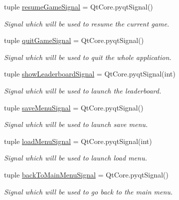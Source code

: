 \begin{DoxyCompactItemize}
\item 
tuple \hyperlink{classsrc_1_1pause__menu_1_1_pause_menu_a0b97feb3939cd6be81c71ba6dbe67669}{resume\+Game\+Signal} = Qt\+Core.\+pyqt\+Signal()
\begin{DoxyCompactList}\small\item\em Signal which will be used to resume the current game. \end{DoxyCompactList}\item 
tuple \hyperlink{classsrc_1_1pause__menu_1_1_pause_menu_aea554e6749ca45f516618711530a1acd}{quit\+Game\+Signal} = Qt\+Core.\+pyqt\+Signal()
\begin{DoxyCompactList}\small\item\em Signal which will be used to quit the whole application. \end{DoxyCompactList}\item 
tuple \hyperlink{classsrc_1_1pause__menu_1_1_pause_menu_abaa0c6d5831d9bfb1d99d7431e47a981}{show\+Leaderboard\+Signal} = Qt\+Core.\+pyqt\+Signal(int)
\begin{DoxyCompactList}\small\item\em Signal which will be used to launch the leaderboard. \end{DoxyCompactList}\item 
tuple \hyperlink{classsrc_1_1pause__menu_1_1_pause_menu_a48613202c1a9051758755bf8fcdd2ecc}{save\+Menu\+Signal} = Qt\+Core.\+pyqt\+Signal()
\begin{DoxyCompactList}\small\item\em Signal which will be used to launch save menu. \end{DoxyCompactList}\item 
tuple \hyperlink{classsrc_1_1pause__menu_1_1_pause_menu_ae1851c6cab071ed1a4473320110432d8}{load\+Menu\+Signal} = Qt\+Core.\+pyqt\+Signal(int)
\begin{DoxyCompactList}\small\item\em Signal which will be used to launch load menu. \end{DoxyCompactList}\item 
tuple \hyperlink{classsrc_1_1pause__menu_1_1_pause_menu_adc8bc5514ba8991d100512319659d24e}{back\+To\+Main\+Menu\+Signal} = Qt\+Core.\+pyqt\+Signal()
\begin{DoxyCompactList}\small\item\em Signal which will be used to go back to the main menu. \end{DoxyCompactList}\end{DoxyCompactItemize}


